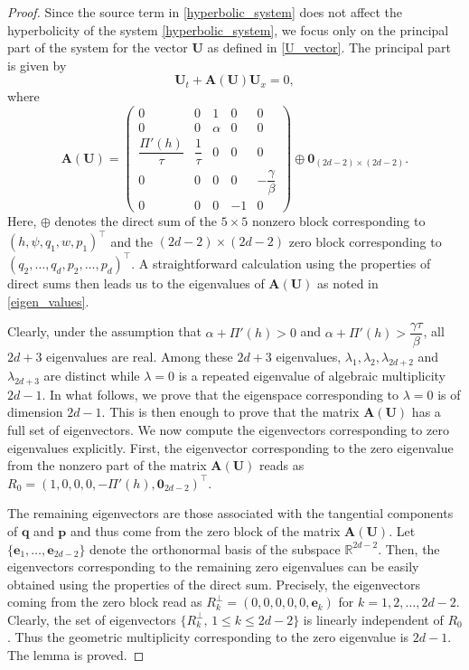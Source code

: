 \documentclass[11pt]{article}
\numberwithin{equation}{section}
\newtheorem{counter example}[theorem]{Counter Example}
\numberwithin{equation}{section}
\numberwithin{equation}{section}
\begin{document}
\begin{proof}
Since the source term in \eqref{hyperbolic_system} does not affect the hyperbolicity of the system \eqref{hyperbolic_system}, we focus only on the principal part of the system for the vector $\mathbf{U}$ as defined in \eqref{U_vector}. The principal part is given by
\[
\mathbf{U}_t+\mathbf{A(U)}\mathbf{U}_{x}=0,
\]
where
\[
\mathbf A(\mathbf U)
=
\begin{pmatrix}
0&0&1&0&0\\[0.2em]
0&0&\alpha&0&0\\[0.2em]
\dfrac{\Pi'(h)}{\tau}&\dfrac{1}{\tau}&0&0&0\\[0.6em]
0&0&0&0&-\dfrac{\gamma}{\beta}\\[0.6em]
0&0&0&-1&0
\end{pmatrix}
\oplus
\mathbf{0}_{(2d-2)\times(2d-2)}.
\]
Here, $\oplus$ denotes the direct sum of the $5\times 5$ nonzero block corresponding to $(h, \psi, q_1, w, p_1)^\top$ and the ${{(2d-2)}\times {(2d-2)}}$ zero block corresponding to $(q_2, \ldots, q_d, p_2, \ldots, p_d)^\top$. A straightforward calculation using the properties of direct sums then leads us to the eigenvalues of $\mathbf{A(U)}$ as noted in \eqref{eigen_values}.

Clearly, under the assumption that $\alpha+\Pi'(h)>0$ and $\alpha+\Pi'(h)> \dfrac{\gamma \tau}{\beta}$, all $2d+3$ eigenvalues are real. Among these $2d+3$ eigenvalues, $\lambda_1, \lambda_2, \lambda_{2d+2}$ and $\lambda_{2d+3}$ are distinct while $\lambda=0$ is a repeated eigenvalue of algebraic multiplicity $2d-1$. In what follows, we prove that the eigenspace corresponding to $\lambda=0$ is of dimension $2d-1$. This is then enough to prove that the matrix $\mathbf{A(U)}$ has a full set of eigenvectors. We now compute the eigenvectors corresponding to zero eigenvalues explicitly. First, the eigenvector corresponding to the zero eigenvalue from the nonzero part of the matrix $\mathbf{A(U)}$ reads as $R_0=\left(1,0,0,0,-\Pi'(h),\mathbf 0_{2d-2}\right)^\top$.

The remaining eigenvectors are those associated with the
tangential components of $\mathbf q$ and $\mathbf p$ and thus come from the zero block of the matrix $\mathbf{A(U)}$. Let $\{\mathbf e_1,\ldots,\mathbf e_{2d-2}\}$ denote the orthonormal basis of the subspace $\mathbb R^{2d-2}$. Then, the eigenvectors corresponding to the remaining zero eigenvalues can be easily obtained using the properties of the direct sum. Precisely, the eigenvectors coming from the zero block read as $R_k^{\perp}=(0, 0, 0, 0, 0, \mathbf{e}_k)$ for $k=1, 2, \ldots, 2d-2$. Clearly, the set of eigenvectors $\{R_k^{\perp}, \, 1\leq k\leq 2d-2\}$ is linearly independent of $R_0$. Thus the geometric multiplicity corresponding to the zero eigenvalue is $2d-1$. The lemma is proved.
\end{proof}
\end{document}
